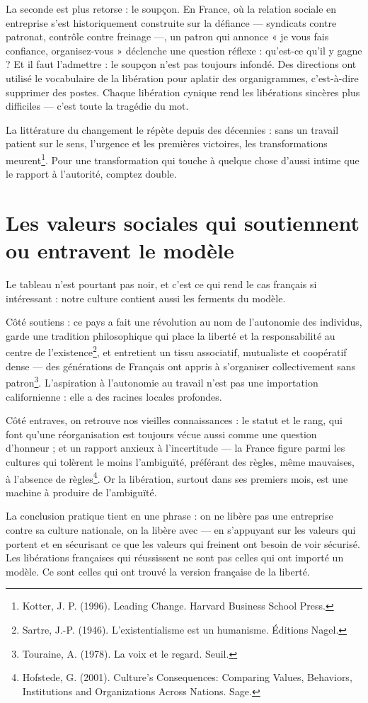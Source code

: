 La seconde est plus retorse : le soupçon. En France, où la relation sociale en entreprise s'est historiquement construite sur la défiance — syndicats contre patronat, contrôle contre freinage —, un patron qui annonce « je vous fais confiance, organisez-vous » déclenche une question réflexe : qu'est-ce qu'il y gagne ? Et il faut l'admettre : le soupçon n'est pas toujours infondé. Des directions ont utilisé le vocabulaire de la libération pour aplatir des organigrammes, c'est-à-dire supprimer des postes. Chaque libération cynique rend les libérations sincères plus difficiles — c'est toute la tragédie du mot.

La littérature du changement le répète depuis des décennies : sans un travail patient sur le sens, l'urgence et les premières victoires, les transformations meurent\footnote{Kotter, J. P. (1996). Leading Change. Harvard Business School Press.}. Pour une transformation qui touche à quelque chose d'aussi intime que le rapport à l'autorité, comptez double.

\section{Les valeurs sociales qui soutiennent ou entravent le modèle}

Le tableau n'est pourtant pas noir, et c'est ce qui rend le cas français si intéressant : notre culture contient aussi les ferments du modèle.

Côté soutiens : ce pays a fait une révolution au nom de l'autonomie des individus, garde une tradition philosophique qui place la liberté et la responsabilité au centre de l'existence\footnote{Sartre, J.-P. (1946). L'existentialisme est un humanisme. Éditions Nagel.}, et entretient un tissu associatif, mutualiste et coopératif dense — des générations de Français ont appris à s'organiser collectivement sans patron\footnote{Touraine, A. (1978). La voix et le regard. Seuil.}. L'aspiration à l'autonomie au travail n'est pas une importation californienne : elle a des racines locales profondes.

Côté entraves, on retrouve nos vieilles connaissances : le statut et le rang, qui font qu'une réorganisation est toujours vécue aussi comme une question d'honneur ; et un rapport anxieux à l'incertitude — la France figure parmi les cultures qui tolèrent le moins l'ambiguïté, préférant des règles, même mauvaises, à l'absence de règles\footnote{Hofstede, G. (2001). Culture's Consequences: Comparing Values, Behaviors, Institutions and Organizations Across Nations. Sage.}. Or la libération, surtout dans ses premiers mois, est une machine à produire de l'ambiguïté.

La conclusion pratique tient en une phrase : on ne libère pas une entreprise contre sa culture nationale, on la libère avec — en s'appuyant sur les valeurs qui portent et en sécurisant ce que les valeurs qui freinent ont besoin de voir sécurisé. Les libérations françaises qui réussissent ne sont pas celles qui ont importé un modèle. Ce sont celles qui ont trouvé la version française de la liberté.
